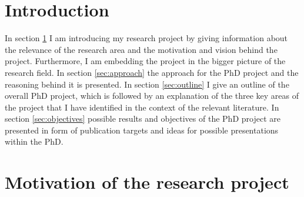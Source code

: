\section*{Introduction}
%
In section \ref{sec:motivation} I am introducing my research project by giving information about the relevance of the research area and the motivation and vision behind the project. 
Furthermore, I am embedding the project in the bigger picture of the research field. In section \ref{sec:approach} the approach for the PhD project and the reasoning behind it
is presented. In section \ref{sec:outline} I give an outline of the overall PhD project, which is followed by an explanation of the three key areas of the project that I have identified
 in the context of the relevant literature. In section \ref{sec:objectives} possible results and objectives of the PhD project are presented in form of publication targets and ideas 
 for possible presentations within the PhD. 

\section{Motivation of the research project} \label{sec:motivation}
%
